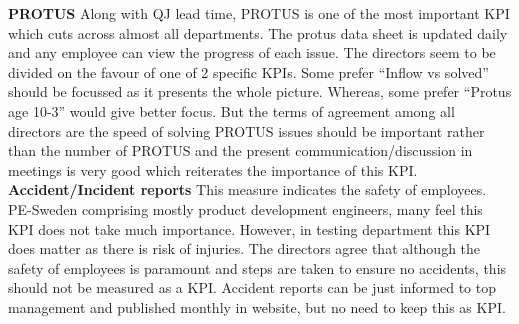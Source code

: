 \begin{enumerate}
\textbf{PROTUS} Along with QJ lead time, PROTUS is one of the most important KPI which cuts across almost all departments. The protus data sheet is updated daily and any employee can view the progress of each issue. The directors seem to be divided on the favour of one of 2 specific KPIs. Some prefer “Inflow vs solved” should be focussed as it presents the whole picture. Whereas, some prefer “Protus age 10-3” would give better focus. But the terms of agreement among all directors are the speed of solving PROTUS issues should be important rather than the number of PROTUS and the present communication/discussion in meetings is very good which reiterates the importance of this KPI.\\

\textbf{Accident/Incident reports} This measure indicates the safety of employees. PE-Sweden comprising mostly product development engineers, many feel this KPI does not take much importance. However, in testing department this KPI does matter as there is risk of injuries. The directors agree that although the safety of employees is paramount and steps are taken to ensure no accidents, this should not be measured as a KPI. Accident reports can be just informed to top management and published monthly in website, but no need to keep this as KPI.\\


\end{enumerate}
